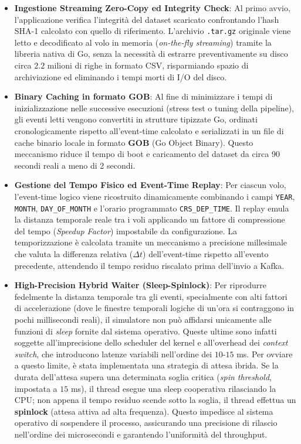 \documentclass[conference]{IEEEtran}
\begin{document}
\begin{itemize}
    \item \textbf{Ingestione Streaming Zero-Copy ed Integrity Check}: Al primo avvio, l'applicazione verifica l'integrità del dataset scaricato confrontando l'hash SHA-1 calcolato con quello di riferimento. L'archivio \texttt{.tar.gz} originale viene letto e decodificato al volo in memoria (\textit{on-the-fly streaming}) tramite la libreria nativa di Go, senza la necessità di estrarre preventivamente su disco circa $2.2$ milioni di righe in formato CSV, risparmiando spazio di archiviazione ed eliminando i tempi morti di I/O del disco.
    
    \item \textbf{Binary Caching in formato GOB}: Al fine di minimizzare i tempi di inizializzazione nelle successive esecuzioni (stress test o tuning della pipeline), gli eventi letti vengono convertiti in strutture tipizzate Go, ordinati cronologicamente rispetto all'event-time calcolato e serializzati in un file di cache binario locale in formato \textbf{GOB} (Go Object Binary). Questo meccanismo riduce il tempo di boot e caricamento del dataset da circa 90 secondi reali a meno di 2 secondi.
    
    \item \textbf{Gestione del Tempo Fisico ed Event-Time Replay}: Per ciascun volo, l'event-time logico viene ricostruito dinamicamente combinando i campi \texttt{YEAR}, \texttt{MONTH}, \texttt{DAY\_OF\_MONTH} e l'orario programmato \texttt{CRS\_DEP\_TIME}. Il replay emula la distanza temporale reale tra i voli applicando un fattore di compressione del tempo (\textit{Speedup Factor}) impostabile da configurazione. La temporizzazione è calcolata tramite un meccanismo a precisione millesimale che valuta la differenza relativa ($\Delta t$) dell'event-time rispetto all'evento precedente, attendendo il tempo residuo riscalato prima dell'invio a Kafka.
    
    \item \textbf{High-Precision Hybrid Waiter (Sleep-Spinlock)}: Per riprodurre fedelmente la distanza temporale tra gli eventi, specialmente con alti fattori di accelerazione (dove le finestre temporali logiche di un'ora si contraggono in pochi millisecondi reali), il simulatore non può affidarsi unicamente alle funzioni di \textit{sleep} fornite dal sistema operativo. Queste ultime sono infatti soggette all'imprecisione dello scheduler del kernel e all'overhead dei \textit{context switch}, che introducono latenze variabili nell'ordine dei $10$-$15$ ms. Per ovviare a questo limite, è stata implementata una strategia di attesa ibrida. Se la durata dell'attesa supera una determinata soglia critica (\textit{spin threshold}, impostata a $15$ ms), il thread esegue una sleep cooperativa rilasciando la CPU; non appena il tempo residuo scende sotto la soglia, il thread effettua un \textbf{spinlock} (attesa attiva ad alta frequenza). Questo impedisce al sistema operativo di sospendere il processo, assicurando una precisione di rilascio nell'ordine dei microsecondi e garantendo l'uniformità del throughput.
    

\end{itemize}
\end{document}
